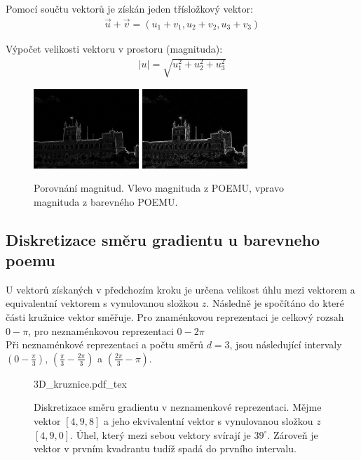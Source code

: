 \documentclass{report}
\begin{document}
Pomocí součtu vektorů je získán jeden třísložkový vektor:
\begin{align}
   \label{soucet_vektrou} \vec{u} + \vec{v} = (u_1 + v_1, u_2 + v_2, u_3 + v_3 )
\end{align} 

Výpočet velikosti vektoru v prostoru (magnituda):
\begin{align}
   \label{velikost_vektoru_v_prostoru} |u| = \sqrt{u_1^2 + u_2^2 + u_3^2}
\end{align} 

\begin{figure}[H]
		\centering
		\includegraphics[width=150px]{./img/magnitude.jpg}	
		\includegraphics[width=150px]{./img/magnitude_3.jpg}	
		\caption{Porovnání magnitud. Vlevo magnituda z POEMU, vpravo magnituda z barevného POEMU.}
\end{figure}


\subsection{Diskretizace směru gradientu u barevneho poemu}
U vektorů získaných v předchozím kroku je určena velikost úhlu mezi vektorem a equivalentní vektorem s vynulovanou složkou $z$. Následně je spočítáno do které části kružnice vektor směřuje. Pro znaménkovou reprezentaci je celkový rozsah $0 - \pi$, pro neznaménkovou reprezentaci $0 - 2\pi$
\\
Při neznaménkové reprezentaci a počtu směrů $d = 3$, jsou následující intervaly $\left(0 - \frac{\pi}{3}\right)$, $\left(\frac{\pi}{3} - \frac{2\pi}{3}\right)$ a  $\left(\frac{2\pi}{3} - \pi\right)$.

\begin{figure}[H]
    \centering    
    \def\svgwidth{\columnwidth}
	{3D_kruznice.pdf_tex}    
    \caption{Diskretizace směru gradientu v neznamenkové reprezentaci. Mějme vektor $[4, 9, 8]$ a jeho ekvivalentní vektor s vynulovanou složkou $z$ $[4,9, 0]$. Úhel, který mezi sebou vektory svírají je $39 ^\circ$. Zároveň je vektor v prvním kvadrantu tudíž spadá do prvního intervalu.}
    \label{fig: diskretizace3D}
\end{figure}
\end{document}
